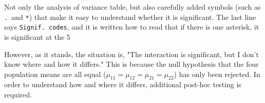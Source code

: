 \documentclass{ltjbook}
\begin{document}
Not only the analysis of variance table, but also carefully added symbols (such as \verb|. |and \verb|*|) that make it easy to understand whether it is significant. The last line says \texttt{Signif. codes}, and it is written how to read that if there is one asterisk, it is significant at the 5%

However, as it stands, the situation is, "The interaction is significant, but I don't know where and how it differs." This is because the null hypothesis that the four population means are all equal ($\mu_{11}=\mu_{12}=\mu_{21}=\mu_{22}$) has only been rejected. In order to understand how and where it differs, additional post-hoc testing is required.
\end{document}
